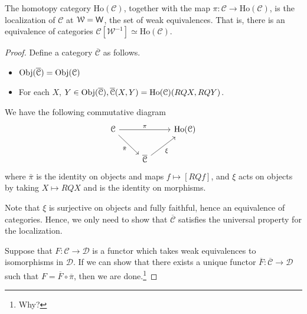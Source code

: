 \documentclass[main.tex]{subfiles}
\begin{document}
\begin{theorem}
  The homotopy category $\mathrm{Ho}(\mathcal{C})$, together with the map $\pi\colon \mathcal{C} \to \mathrm{Ho}(\mathcal{C})$, is the localization of $\mathcal{C}$ at $\mathcal{W} = \mathsf{W}$, the set of weak equivalences. That is, there is an equivalence of categories $\mathcal{C}[\mathcal{W}^{-1}] \simeq \mathrm{Ho}(\mathcal{C})$.
\end{theorem}
\begin{proof}
  Define a category $\overline{\mathcal{C}}$ as follows.
  \begin{itemize}
    \item $\operatorname{Obj}(\overline{\mathcal{C}}) = \operatorname{Obj}(\mathcal{C})$

    \item For each $X$, $Y \in \operatorname{Obj}(\overline{\mathcal{C}}), \overline{\mathcal{C}}(X, Y) = \mathrm{Ho}(\mathcal{C})(RQX, RQY)$.
  \end{itemize}

  We have the following commutative diagram
  \begin{equation*}
    \begin{tikzcd}
      \mathcal{C}
      \arrow[rr, "\pi"]
      \arrow[dr, swap, "\bar{\pi}"]
      && \mathrm{Ho}(\mathcal{C})
      \\
      & \overline{\mathcal{C}}
      \arrow[ur, swap, "\xi"]
    \end{tikzcd}
  \end{equation*}
  where $\bar{\pi}$ is the identity on objects and maps $f \mapsto [RQf]$, and $\xi$ acts on objects by taking $X \mapsto RQX$ and is the identity on morphisms.

  Note that $\xi$ is surjective on objects and fully faithful, hence an equivalence of categories. Hence, we only need to show that $\overline{\mathcal{C}}$ satisfies the universal property for the localization.

  Suppose that $F\colon \mathcal{C} \to \mathcal{D}$ is a functor which takes weak equivalences to isomorphisms in $\mathcal{D}$. If we can show that there exists a unique functor $\overline{F}\colon \overline{\mathcal{C}} \to \mathcal{D}$ such that $F = \overline{F} \circ \overline{\pi}$, then we are done.\footnote{Why?}


\end{proof}
\end{document}
